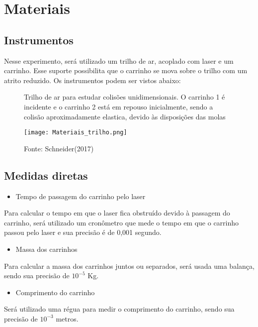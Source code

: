 \documentclass[12pt, twoside]{article}
\begin{document}
\section{Materiais}


\subsection{Instrumentos}
    Nesse experimento, será utilizado um trilho de ar, acoplado com laser e um carrinho. Esse suporte possibilita que o carrinho se mova sobre o trilho com um atrito reduzido. Os instrumentos podem ser vistos abaixo:

    \begin{figure}[h!]
\centering
\caption{Trilho de ar para estudar colisões unidimensionais. O carrinho 1 é incidente e o carrinho 2 está em repouso inicialmente, sendo a colisão aproximadamente elastica, devido às disposições das molas}
\texttt{[image: Materiais\_trilho.png]}
\caption*{Fonte: Schneider(2017)}
\label{fig:exemplo}
\end{figure}
        



    \subsection{Medidas diretas}

    \begin{itemize}
        \item  Tempo de passagem do carrinho pelo laser
        \end{itemize}
Para calcular o tempo em que o laser fica obstruído devido à passagem do carrinho, será utilizado um cronômetro que mede o tempo em que o carrinho passou pelo laser e sua precisão é de 0,001 segundo.
        
    \begin{itemize}
        \item  Massa dos carrinhos
        \end{itemize}
Para calcular a massa dos carrinhos juntos ou separados, será usada uma balança, sendo sua precisão de $10^{-5}$ Kg.

\begin{itemize}
        \item  Comprimento do carrinho
        \end{itemize}

        Será utilizado uma régua para medir o comprimento do carrinho, sendo sua precisão de $10^{-3}$ metros. 
\end{document}
